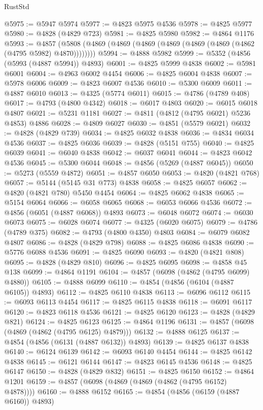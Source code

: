 \begin{lexlean}{RustStd}
\begin{coremodule}
@5975 := @5947 @5974
@5977 := @4823 @5975 @4536
@5978 := @4825 @5977
@5980 := @4828 (@4829 @723)
@5981 := @4825 @5980
@5982 := @4864 @1176
@5993 := @4857 (@5808 (@4869 (@4869 (@4869 (@4869 (@4869 (@4869 (@4862 (@4795 @5982) @4870))))))))
@5994 := @4888 @5982
@5999 := @5352 (@4856 (@5993 (@4887 @5994)) @4893)
@6001 := @4825 @5999 @4838
@6002 := @5981 @6001
@6004 := @4963 @6002 @4454
@6006 := @4825 @6004 @4838
@6007 := @5978 @6006
@6009 := @4823 @6007 @4536
@6010 := @5300 @6009
@6011 := @4887 @6010
@6013 := @4325 (@5774 @6011)
@6015 := @4786 (@4789 @408)
@6017 := @4793 (@4800 @4342)
@6018 := @6017 @4803
@6020 := @6015 @6018 @4807
@6021 := @5231 @1181
@6027 := @4811 (@4812 (@4795 @6021) @5236 @4853) @4886
@6028 := @4809 @6027
@6030 := @4851 (@5579 @6021)
@6032 := @4828 (@4829 @739)
@6034 := @4825 @6032 @4838
@6036 := @4834 @6034 @4536
@6037 := @4825 @6036
@6039 := @4828 (@5151 @755)
@6040 := @4825 @6039
@6041 := @6040 @4838
@6042 := @6037 @6041
@6044 := @4823 @6042 @4536
@6045 := @5300 @6044
@6048 := @4856 (@5269 (@4887 @6045))
@6050 := @5273 (@5559 @4872)
@6051 := @4857 @6050
@6053 := @4820 (@4821 @768)
@6057 := @5144 (@5145 @31 @773) @4838
@6058 := @4825 @6057
@6062 := @4820 (@4821 @780) @5450 @4454
@6064 := @4825 @6062 @4838
@6065 := @5154 @6064
@6066 := @6058 @6065
@6068 := @6053 @6066 @4536
@6072 := @4856 (@6051 (@4887 @6068)) @4893
@6073 := @6048 @6072
@6074 := @6030 @6073
@6075 := @6028 @6074
@6077 := @4325 (@6020 @6075)
@6079 := @4786 (@4789 @375)
@6082 := @4793 (@4800 @4350) @4803
@6084 := @6079 @6082 @4807
@6086 := @4828 (@4829 @798)
@6088 := @4825 @6086 @4838
@6090 := @5776 @6088 @4536
@6091 := @4825 @6090
@6093 := @4820 (@4821 @808)
@6095 := @4828 (@4829 @810)
@6096 := @4825 @6095
@6098 := @4858 @45 @138
@6099 := @4864 @1191
@6104 := @4857 (@6098 (@4862 (@4795 @6099) @4880))
@6105 := @4888 @6099
@6110 := @4854 (@4856 (@6104 (@4887 @6105)) @4893)
@6112 := @4825 @6110 @4838
@6113 := @6096 @6112
@6115 := @6093 @6113 @4454
@6117 := @4825 @6115 @4838
@6118 := @6091 @6117
@6120 := @4823 @6118 @4536
@6121 := @4825 @6120
@6123 := @4828 (@4829 @821)
@6124 := @4825 @6123
@6125 := @4864 @1196
@6131 := @4857 (@6098 (@4869 (@4862 (@4795 @6125) @4879)))
@6132 := @4888 @6125
@6137 := @4854 (@4856 (@6131 (@4887 @6132)) @4893)
@6139 := @4825 @6137 @4838
@6140 := @6124 @6139
@6142 := @6093 @6140 @4454
@6144 := @4825 @6142 @4838
@6145 := @6121 @6144
@6147 := @4823 @6145 @4536
@6148 := @4825 @6147
@6150 := @4828 (@4829 @832)
@6151 := @4825 @6150
@6152 := @4864 @1201
@6159 := @4857 (@6098 (@4869 (@4869 (@4862 (@4795 @6152) @4878))))
@6160 := @4888 @6152
@6165 := @4854 (@4856 (@6159 (@4887 @6160)) @4893)

\end{coremodule}
\end{lexlean}
